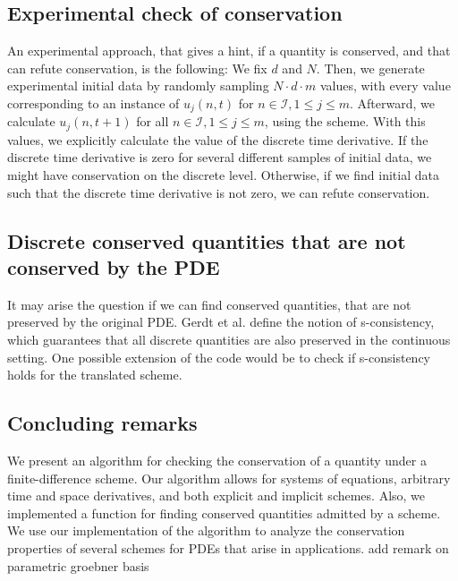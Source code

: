 \documentclass[runningheads]{llncs}
\newcommand{\1}{\chi}
\newcommand{\Ii}{\mathcal{I}}
\begin{document}
\subsection{Experimental check of conservation}
An experimental approach, that gives a hint, if a quantity is conserved, and that can refute conservation, is the following:
We fix $d$ and $N$. Then, we generate experimental initial data by randomly sampling $N\cdot d\cdot m$ values, with every value corresponding to an instance of $u_j(n,t)$ for $n\in\Ii,1\leq j\leq m$. Afterward, we calculate $u_j(n,t+1)$ for all $n\in\Ii,1\leq j\leq m$, using the scheme. With this values, we explicitly calculate the value of the discrete time derivative.
If the discrete time derivative is zero for several different samples of initial data, we might have conservation on the discrete level. Otherwise, if we find initial data such that the discrete time derivative is not zero, we can refute conservation.\\
\subsection{Discrete conserved quantities that are not conserved by the PDE}
It may arise the question if we can find conserved quantities, that are not preserved by the original PDE. Gerdt et al. \cite{gerdt10,gerdt12} define the notion of s-consistency, which guarantees that all discrete quantities are also preserved in the continuous setting. One possible extension of the code would be to check if s-consistency holds for the translated scheme.\\
\subsection{Concluding remarks}
We present an algorithm for checking the conservation of a quantity under a finite-difference scheme. Our algorithm allows for systems of equations, arbitrary time and space derivatives, and both explicit and implicit schemes. Also, we implemented a function for finding conserved quantities admitted by a scheme. We use our implementation of the algorithm to analyze the conservation properties of several schemes for PDEs that arise in applications. {\color{red} add remark on parametric groebner basis}




\end{document}
